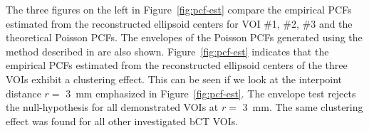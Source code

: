 \documentclass[journal]{IEEEtran}
\begin{document}

The three figures on the left in Figure~\ref{fig:pcf-est} compare the
empirical PCFs estimated from the reconstructed ellipsoid centers for
VOI \#1, \#2, \#3 and the theoretical Poisson PCFs. The envelopes of
the Poisson PCFs generated using the method described in
\cite{baddeley2014tests} are also shown. Figure~\ref{fig:pcf-est}
indicates that the empirical PCFs estimated from the reconstructed
ellipsoid centers of the three VOIs exhibit a clustering effect. This
can be seen if we look at the interpoint distance $r = $ \SI{3}{\mm}
emphasized in Figure~\ref{fig:pcf-est}. The envelope test rejects the
null-hypothesis for all demonstrated VOIs at $r = $ \SI{3}{\mm}. The
same clustering effect was found for all other investigated bCT VOIs.
\end{document}
